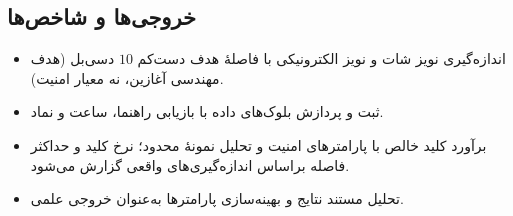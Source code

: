 \subsection{خروجی‌ها و شاخص‌ها}
\begin{itemize}[leftmargin=*,itemsep=2pt]
\item اندازه‌گیری نویز شات و نویز الکترونیکی با فاصلهٔ هدف دست‌کم $10$ دسی‌بل (هدف مهندسی آغازین، نه معیار امنیت).
\item ثبت و پردازش بلوک‌های داده با بازیابی راهنما، ساعت و نماد.
\item برآورد کلید خالص  با پارامترهای امنیت و تحلیل نمونهٔ محدود؛ نرخ کلید و حداکثر فاصله براساس اندازه‌گیری‌های واقعی گزارش می‌شود.
\item تحلیل مستند نتایج و بهینه‌سازی پارامترها به‌عنوان خروجی علمی.
\end{itemize}

